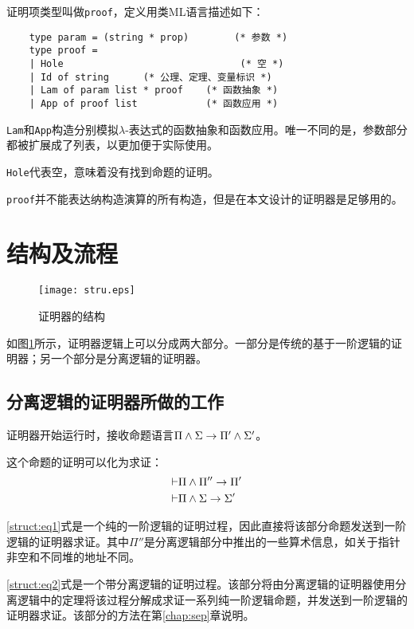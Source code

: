 证明项类型叫做\texttt{proof}，定义用类ML语言描述如下：
\begin{verbatim}
    type param = (string * prop)        (* 参数 *)
    type proof =
    | Hole                               (* 空 *)
    | Id of string      (* 公理、定理、变量标识 *)
    | Lam of param list * proof    (* 函数抽象 *)
    | App of proof list            (* 函数应用 *)
\end{verbatim}

\texttt{Lam}和\texttt{App}构造分别模拟$\lambda$-表达式的函数抽象和函数应用。唯一不同的是，参数部分都被扩展成了列表，以更加便于实际使用。

\texttt{Hole}代表空，意味着没有找到命题的证明。

\texttt{proof}并不能表达纳构造演算的所有构造，但是在本文设计的证明器是足够用的。

\section{结构及流程}

\begin{figure}[!htbp]
  \centering
  \texttt{[image: stru.eps]}
  \caption{证明器的结构}
  \label{struct:fig}
\end{figure}

如图\ref{struct:fig}所示，证明器逻辑上可以分成两大部分。一部分是传统的基于一阶逻辑的证明器；另一个部分是分离逻辑的证明器。

\subsection{分离逻辑的证明器所做的工作}
证明器开始运行时，接收命题语言$\Pi \land \Sigma \rightarrow \Pi' \land \Sigma'$。

这个命题的证明可以化为求证：
\begin{eqnarray}
  \vdash & \Pi \land \Pi'' \rightarrow \Pi' \label{struct:eq1}\\
  \vdash & \Pi \land \Sigma \rightarrow \Sigma' \label{struct:eq2}
\end{eqnarray}

\ref{struct:eq1}式是一个纯的一阶逻辑的证明过程，因此直接将该部分命题发送到一阶逻辑的证明器求证。其中$\Pi''$是分离逻辑部分中推出的一些算术信息，如关于指针非空和不同堆的地址不同。

\ref{struct:eq2}式是一个带分离逻辑的证明过程。该部分将由分离逻辑的证明器使用分离逻辑中的定理将该过程分解成求证一系列纯一阶逻辑命题，并发送到一阶逻辑的证明器求证。该部分的方法在第\ref{chap:sep}章说明。

